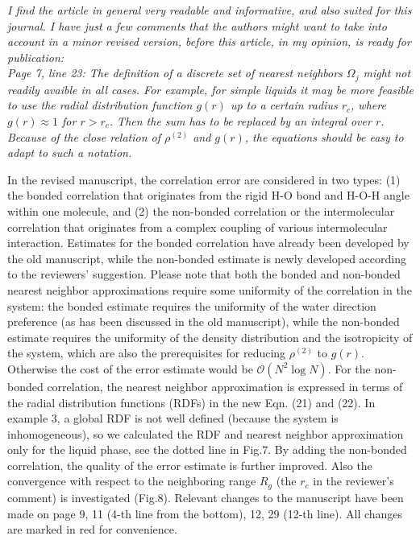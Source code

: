 \documentclass[a4paper]{article}
\begin{document}
\textit{
  I find the article in general very readable and informative, and
  also suited for this journal. I have just a few comments that the
  authors might want to take into account in a minor revised version,
  before this article, in my opinion, is ready for publication:
}\\

\textit{ Page 7, line 23: The definition of a discrete set of nearest
  neighbors $\Omega_j$ might not readily avaible in all cases. For
  example, for simple liquids it may be more feasible to use the
  radial distribution function $g(r)$ up to a certain radius $r_c$,
  where $g(r) \approx 1$ for $r > r_c$. Then the sum has to be
  replaced by an integral over $r$.  Because of the close relation of
  $\rho^{(2)}$ and $g(r)$, the equations should be easy to adapt to
  such a notation.  }

In the revised manuscript, the correlation error are considered
in two types: 
(1) the bonded correlation
that originates from the rigid H-O
bond and H-O-H angle within one molecule,
and (2) the
non-bonded correlation or the
intermolecular correlation that originates from
a complex coupling of various intermolecular interaction.
Estimates for the bonded correlation
have already been developed by the old manuscript,
while the non-bonded estimate
is newly developed according to the reviewers' suggestion.
Please note that
both the bonded and non-bonded nearest neighbor approximations
require some uniformity of the correlation in the system:
the bonded estimate requires the uniformity of the water
direction preference (as has been discussed in the old manuscript),
while the non-bonded estimate requires the uniformity
of the density distribution and the isotropicity of the system, which
are also the prerequisites for reducing $\rho^{(2)}$ to $g(r)$.
Otherwise the cost of the error estimate would be $\mathcal O(N^2\log N)$.
For the non-bonded correlation,  the nearest neighbor approximation 
is expressed in terms of the radial distribution
functions (RDFs) in the new Eqn. (21) and (22).
In example 3, a global RDF is not well defined
(because the system is inhomogeneous),
so we calculated the RDF and nearest neighbor approximation
only for the liquid phase, see the dotted line in Fig.7. By adding the
non-bonded correlation, the quality of the error estimate
is further improved.
Also the convergence with respect to
the neighboring range $R_g$ (the $r_c$ in the reviewer's comment)
is investigated (Fig.8). 
Relevant changes to the manuscript
have been made on page 9,
11 (4-th line from the bottom), 12, 29 (12-th line). All changes are marked 
in red for convenience.
\\
\end{document}
